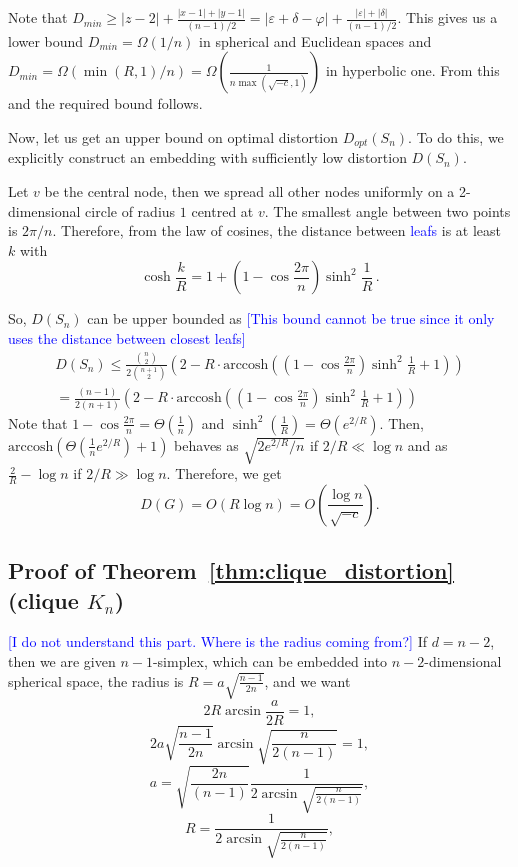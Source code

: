 \documentclass{article} %
\newcommand{\ph}[1]{\textcolor{blue}{#1}}
\begin{document}
Note that $D_{min} \ge |z-2| + \frac{|x-1| + |y-1|}{(n-1)/2} =  |\varepsilon + \delta - \varphi| + \frac{|\varepsilon| + |\delta|}{(n-1)/2}$. This gives us a lower bound $D_{min} = \Omega(1/n)$ in spherical and Euclidean spaces and $D_{min} = \Omega(\min(R,1)/n) = \Omega\left(\frac{1}{n\max\left(\sqrt{-c},1\right)}\right)$ in hyperbolic one. From this and  the required bound follows.

Now, let us get an upper bound on optimal distortion $D_{opt}(S_n)$. To do this, we explicitly construct an embedding with sufficiently low distortion $D(S_n)$.

Let $v$ be the central node, then we spread all other nodes uniformly on a 2-dimensional circle of radius $1$ centred at $v$. The smallest angle between two points is $2 \pi / n$. Therefore, from the law of cosines, the distance between \ph{leafs} is at least $k$ with
\[
\cosh \frac{k}{R} = 1  + \left(1 -  \cos \frac{2 \pi}{n}\right)  \sinh^2 \frac{1}{R} \,.
\]


So, $D(S_n)$ can be upper bounded as \ph{[This bound cannot be true since it only uses the distance between closest leafs]}
\begin{multline*}
D(S_n) \le \frac{{n \choose 2}}{2{n+1\choose 2}} \left(2 - R\cdot \mathrm{arccosh}\left( \left(1 - \cos \frac{2 \pi}{n}\right)\sinh^2\frac{1}{R}  + 1 \right)\right) \\
= \frac{(n-1)}{2(n+1)} \left(2 - R\cdot \mathrm{arccosh}\left( \left(1 - \cos \frac{2 \pi}{n}\right)\sinh^2\frac{1}{R}  + 1 \right)\right)
\end{multline*}
Note that $1 - \cos\frac{2\pi}{n} = \Theta\left(\frac{1}{n}\right)$ and $\sinh^2\left(\frac{1}{R}\right) = \Theta\left(e^{2/R}\right)$.
Then, $\textrm{arccosh}\left(\Theta\left(\frac{1}{n} e^{2/R}\right) + 1 \right)$ behaves as $\sqrt{2e^{2/R}/n}$ if $2/R \ll \log n$ and as $\frac{2}{R} - \log n$ if $2/R \gg \log n$.
Therefore, we get
\[
D(G) = O\left( R \log n \right) = O\left( \frac{\log n}{\sqrt{-c}} \right).
\]

\subsection{Proof of Theorem~\ref{thm:clique_distortion} (clique $K_n$)}

\ph{[I do not understand this part. Where is the radius coming from?]}
If $d = n-2$, then we are given $n-1$-simplex, which can be embedded into $n-2$-dimensional spherical space, the radius is $R = a\sqrt{\frac{n-1}{2n}}$, and we want
\[
2 R \arcsin \frac{a}{2R} = 1,
\]
\[
2 a\sqrt{\frac{n-1}{2n}} \arcsin \sqrt{\frac{n}{2(n-1)}} = 1,
\]
\[
a  = \sqrt{\frac{2n}{(n-1)}}\frac{1}{2\arcsin \sqrt{\frac{n}{2(n-1)}}},
\]
\[
R = \frac{1}{2\arcsin \sqrt{\frac{n}{2(n-1)}}},
\]
\end{document}
